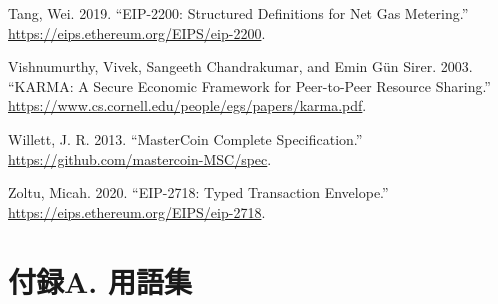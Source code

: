 \documentclass[
]{ltjsarticle}
\newlength{\cslhangindent}
\newlength{\cslentryspacingunit} %
\newenvironment{CSLReferences}[2] %
 {%
  \setlength{\parindent}{0pt}
  \ifodd #1
  \let\oldpar\par
  \def\par{\hangindent=\cslhangindent\oldpar}
  \fi
  \setlength{\parskip}{#2\cslentryspacingunit}
 }%
 {}
\begin{document}
\begin{CSLReferences}{1}{0}
\leavevmode{}%
Tang, Wei. 2019. ``EIP-2200: Structured Definitions for Net Gas
Metering.'' \url{https://eips.ethereum.org/EIPS/eip-2200}.

\leavevmode{}%
Vishnumurthy, Vivek, Sangeeth Chandrakumar, and Emin Gün Sirer. 2003.
``KARMA: A Secure Economic Framework for Peer-to-Peer Resource
Sharing.'' \url{https://www.cs.cornell.edu/people/egs/papers/karma.pdf}.

\leavevmode{}%
Willett, J. R. 2013. ``MasterCoin Complete Specification.''
\url{https://github.com/mastercoin-MSC/spec}.

\leavevmode{}%
Zoltu, Micah. 2020. ``EIP-2718: Typed Transaction Envelope.''
\url{https://eips.ethereum.org/EIPS/eip-2718}.

\end{CSLReferences}

\protect\hypertarget{ch:Terminology}{}{}

\hypertarget{ux4ed8ux9332a.-ux7528ux8a9eux96c6}{%
\section{付録A. 用語集}\label{ux4ed8ux9332a.-ux7528ux8a9eux96c6}}
\end{document}
